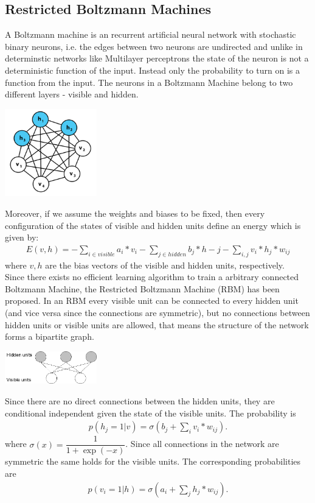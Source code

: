 \documentclass[a4paper]{scrartcl}
\begin{document}
\subsection{Restricted Boltzmann Machines}
A Boltzmann machine is an recurrent artificial neural network with stochastic binary neurons, i.e. the edges between two neurons are undirected and unlike in determinstic networks like Multilayer perceptrons the state of the neuron is not a deterministic function of the input. Instead only the probability to turn on is a function from the input. The neurons in a Boltzmann Machine belong to two different layers - visible and hidden. 
\begin{center}
\includegraphics[width=4cm]{images/Boltzmannmachine.png}
\end{center}
Moreover, if we assume the weights and biases to be fixed, then every configuration of the states of visible and hidden units define an energy which is given by:
\begin{align}
E(v,h) = - \sum_{i \in visible} a_i*v_i - \sum_{j \in hidden} b_j*h-j - \sum_{i,j} v_i*h_j*w_{ij}
\end{align}
where $v, h$ are the bias vectors of the visible and hidden units, respectively. \\
Since there exists no efficient learning algorithm to train a arbitrary connected Boltzmann Machine, the Restricted Boltzmann Machine (RBM) has been proposed. In an RBM every visible unit can be connected to every hidden unit (and vice versa since the connections are symmetric), but no connections between hidden units or visible units are allowed, that means the structure of the network forms a bipartite graph.
\begin{center}
\includegraphics[width=4cm]{images/rbm.png}
\end{center} 
Since there are no direct connections between the hidden units, they are conditional independent given the state of the visible units. The probability is
\begin{align}
p(h_j = 1|v) = \sigma(b_j + \sum_i v_i*w_{ij}).
\end{align}
where $\sigma(x) = \dfrac{1}{1+\exp(-x)}$. Since all connections in the network are symmetric the same holds for the visible units. The corresponding probabilities are
\begin{align}
p(v_i = 1|h) = \sigma(a_i + \sum_j h_j*w_{ij}).
\end{align}
\end{document}
